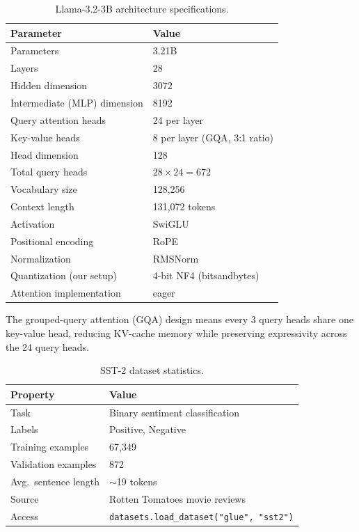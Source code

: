 \documentclass[twoside,english]{article}
\begin{document}
\begin{table}[h]
\centering
\caption{Llama-3.2-3B architecture specifications.}
\begin{tabular}{ll}
\toprule
\textbf{Parameter} & \textbf{Value} \\
\midrule
Parameters & 3.21B \\
Layers & 28 \\
Hidden dimension & 3072 \\
Intermediate (MLP) dimension & 8192 \\
Query attention heads & 24 per layer \\
Key-value heads & 8 per layer (GQA, 3:1 ratio) \\
Head dimension & 128 \\
Total query heads & $28 \times 24 = 672$ \\
Vocabulary size & 128,256 \\
Context length & 131,072 tokens \\
Activation & SwiGLU \\
Positional encoding & RoPE \\
Normalization & RMSNorm \\
Quantization (our setup) & 4-bit NF4 (bitsandbytes) \\
Attention implementation & eager \\
\bottomrule
\end{tabular}
\label{tab:model-spec}
\end{table}

The grouped-query attention (GQA) design means every 3 query heads share one key-value head, reducing KV-cache memory while preserving expressivity across the 24 query heads.

\begin{table}[h]
\centering
\caption{SST-2 dataset statistics.}
\begin{tabular}{ll}
\toprule
\textbf{Property} & \textbf{Value} \\
\midrule
Task & Binary sentiment classification \\
Labels & Positive, Negative \\
Training examples & 67,349 \\
Validation examples & 872 \\
Avg.\ sentence length & $\sim$19 tokens \\
Source & Rotten Tomatoes movie reviews \\
Access & \texttt{datasets.load\_dataset("glue", "sst2")} \\
\bottomrule
\end{tabular}
\label{tab:sst2-stats}
\end{table}
\end{document}
